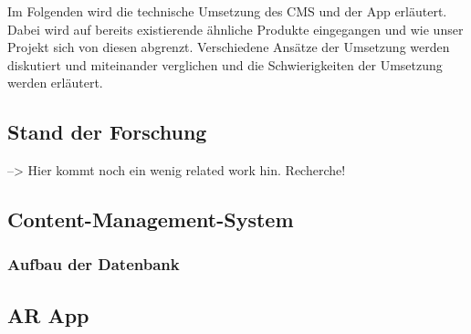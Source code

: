 \documentclass[titlepage, a4paper, 11pt]{scrartcl}
\begin{document}
  Im Folgenden wird die technische Umsetzung des CMS und der App erläutert. 
  Dabei wird auf bereits existierende ähnliche Produkte eingegangen und wie unser Projekt sich von diesen abgrenzt. 
  Verschiedene Ansätze der Umsetzung werden diskutiert und miteinander verglichen und die Schwierigkeiten der Umsetzung werden erläutert.

  

  \subsection{Stand der Forschung}

  --> Hier kommt noch ein wenig related work hin. Recherche!

  \subsection{Content-Management-System}

  



  \subsubsection{Aufbau der Datenbank}
  \subsection{AR App}
\end{document}
